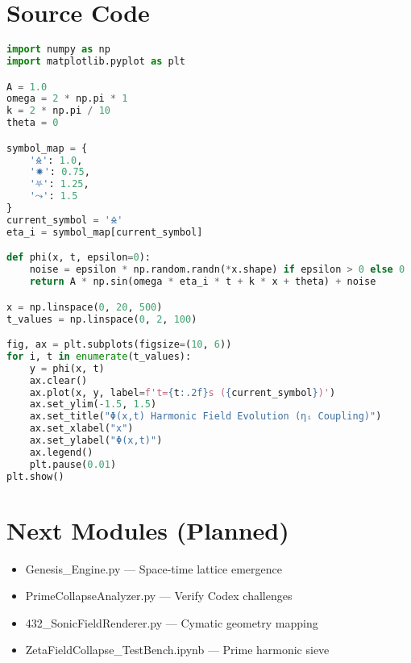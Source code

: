 \documentclass[12pt]{article}
\begin{document}
\section*{Source Code}
\begin{lstlisting}[language=Python, basicstyle=\ttfamily\small, keywordstyle=\color{blue}]
import numpy as np
import matplotlib.pyplot as plt

A = 1.0
omega = 2 * np.pi * 1
k = 2 * np.pi / 10
theta = 0

symbol_map = {
    '🜎': 1.0,
    '🟒': 0.75,
    '⛧': 1.25,
    '⤳': 1.5
}
current_symbol = '🜎'
eta_i = symbol_map[current_symbol]

def phi(x, t, epsilon=0):
    noise = epsilon * np.random.randn(*x.shape) if epsilon > 0 else 0
    return A * np.sin(omega * eta_i * t + k * x + theta) + noise

x = np.linspace(0, 20, 500)
t_values = np.linspace(0, 2, 100)

fig, ax = plt.subplots(figsize=(10, 6))
for i, t in enumerate(t_values):
    y = phi(x, t)
    ax.clear()
    ax.plot(x, y, label=f't={t:.2f}s ({current_symbol})')
    ax.set_ylim(-1.5, 1.5)
    ax.set_title("Φ(x,t) Harmonic Field Evolution (ηᵢ Coupling)")
    ax.set_xlabel("x")
    ax.set_ylabel("Φ(x,t)")
    ax.legend()
    plt.pause(0.01)
plt.show()
\end{lstlisting}

\section*{Next Modules (Planned)}
\begin{itemize}
    \item Genesis\_Engine.py — Space-time lattice emergence
    \item PrimeCollapseAnalyzer.py — Verify Codex challenges
    \item 432\_SonicFieldRenderer.py — Cymatic geometry mapping
    \item ZetaFieldCollapse\_TestBench.ipynb — Prime harmonic sieve
\end{itemize}
\end{document}
